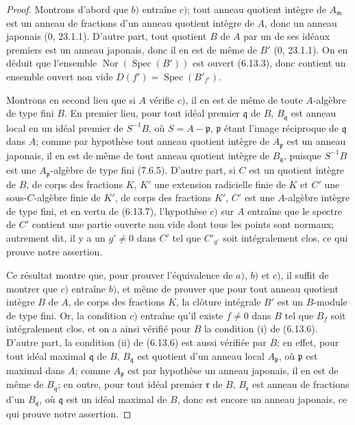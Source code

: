 \begin{proof}
Montrons d'abord que $b)$ entraîne $c)$; tout anneau quotient intègre de
$A_{\mathfrak m}$ est un anneau de fractions d'un anneau quotient intègre de
$A$, donc un anneau japonais (0, 23.1.1). D'autre part, tout quotient $B$ de
$A$ par un de ses idéaux premiers est un anneau japonais, donc il en est de
même de $B'$ (0, 23.1.1). On en déduit que l'ensemble
$\operatorname{Nor}(\operatorname{Spec}(B'))$ est ouvert (6.13.3), donc
contient un ensemble ouvert non vide
$D(f')=\operatorname{Spec}(B'_{f'})$.


Montrons en second lieu que si $A$ vérifie $c)$, il en est de même de toute
$A$-algèbre de type fini $B$. En premier lieu, pour tout idéal premier
$\mathfrak q$ de $B$, $B_{\mathfrak q}$ est anneau local en un idéal premier
de $S^{-1}B$, où $S=A-\mathfrak p$, $\mathfrak p$ étant l'image réciproque de
$\mathfrak q$ dans $A$; comme par hypothèse tout anneau quotient intègre de
$A_{\mathfrak p}$ est un anneau japonais, il en est de même de tout anneau
quotient intègre de $B_{\mathfrak q}$, puisque $S^{-1}B$ est une
$A_{\mathfrak p}$-algèbre de type fini (7.6.5). D'autre part, si $C$ est un
quotient intègre de $B$, de corps des fractions $K$, $K'$ une extension
radicielle finie de $K$ et $C'$ une sous-$C$-algèbre finie de $K'$, de corps
des fractions $K'$, $C'$ est une $A$-algèbre intègre de type fini, et en vertu
de (6.13.7), l'hypothèse $c)$ sur $A$ entraîne que le spectre de $C'$ contient
une partie ouverte non vide dont tous les points sont normaux; autrement dit,
il y a un $g'\neq0$ dans $C'$ tel que $C'_{g'}$ soit intégralement clos, ce qui
prouve notre assertion.

Ce résultat montre que, pour prouver l'équivalence de $a)$, $b)$ et $c)$, il
suffit de montrer que $c)$ entraîne $b)$, et même de prouver que pour tout
anneau quotient intègre $B$ de $A$, de corps des fractions $K$, la clôture
intégrale $B'$ est un $B$-module de type fini. Or, la condition $c)$ entraîne
qu'il existe $f\neq0$ dans $B$ tel que $B_f$ soit intégralement clos, et on a
ainsi vérifié pour $B$ la condition (i) de (6.13.6). D'autre part, la condition
(ii) de (6.13.6) est aussi vérifiée par $B$; en effet, pour tout idéal maximal
$\mathfrak q$ de $B$, $B_{\mathfrak q}$ est quotient d'un anneau local
$A_{\mathfrak p}$, où $\mathfrak p$ est maximal dans $A$; comme
$A_{\mathfrak p}$ est par hypothèse un anneau japonais, il en est de même de
$B_{\mathfrak q}$; en outre, pour tout idéal premier $\mathfrak r$ de $B$,
$B_{\mathfrak r}$ est anneau de fractions d'un $B_{\mathfrak q}$, où
$\mathfrak q$ est un idéal maximal de $B$, donc est encore un anneau japonais,
ce qui prouve notre assertion.


\end{proof}
